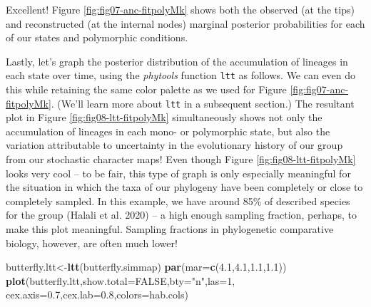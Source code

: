 \documentclass[fleqn,10pt,lineno]{wlpeerj} %
\newenvironment{Shaded}{\begin{snugshade}}{\end{snugshade}}
\newcommand{\AttributeTok}[1]{\textcolor[rgb]{0.13,0.29,0.53}{#1}}
\newcommand{\ConstantTok}[1]{\textcolor[rgb]{0.56,0.35,0.01}{#1}}
\newcommand{\DecValTok}[1]{\textcolor[rgb]{0.00,0.00,0.81}{#1}}
\newcommand{\FloatTok}[1]{\textcolor[rgb]{0.00,0.00,0.81}{#1}}
\newcommand{\FunctionTok}[1]{\textcolor[rgb]{0.13,0.29,0.53}{\textbf{#1}}}
\newcommand{\NormalTok}[1]{#1}
\newcommand{\OtherTok}[1]{\textcolor[rgb]{0.56,0.35,0.01}{#1}}
\newcommand{\StringTok}[1]{\textcolor[rgb]{0.31,0.60,0.02}{#1}}
\begin{document}
Excellent! Figure \ref{fig:fig07-anc-fitpolyMk} shows both the observed (at the tips) and reconstructed (at the internal nodes) marginal posterior probabilities for each of our states and polymorphic conditions.

Lastly, let's graph the posterior distribution of the accumulation of lineages in each state over time, using the \emph{phytools} function \texttt{ltt} as follows. We can even do this while retaining the same color palette as we used for Figure \ref{fig:fig07-anc-fitpolyMk}. (We'll learn more about \texttt{ltt} in a subsequent section.) The resultant plot in Figure \ref{fig:fig08-ltt-fitpolyMk} simultaneously shows not only the accumulation of lineages in each mono- or polymorphic state, but also the variation attributable to uncertainty in the evolutionary history of our group from our stochastic character maps! Even though Figure \ref{fig:fig08-ltt-fitpolyMk} looks very cool -- to be fair, this type of graph is only especially meaningful for the situation in which the taxa of our phylogeny have been completely or close to completely sampled. In this example, we have around 85\% of described species for the group (Halali et al. 2020) -- a high enough sampling fraction, perhaps, to make this plot meaningful. Sampling fractions in phylogenetic comparative biology, however, are often much lower!

\begin{Shaded}
\begin{Highlighting}[]
\NormalTok{butterfly.ltt}\OtherTok{\textless{}{-}}\FunctionTok{ltt}\NormalTok{(butterfly.simmap)}
\FunctionTok{par}\NormalTok{(}\AttributeTok{mar=}\FunctionTok{c}\NormalTok{(}\FloatTok{4.1}\NormalTok{,}\FloatTok{4.1}\NormalTok{,}\FloatTok{1.1}\NormalTok{,}\FloatTok{1.1}\NormalTok{))}
\FunctionTok{plot}\NormalTok{(butterfly.ltt,}\AttributeTok{show.total=}\ConstantTok{FALSE}\NormalTok{,}\AttributeTok{bty=}\StringTok{"n"}\NormalTok{,}\AttributeTok{las=}\DecValTok{1}\NormalTok{,}
  \AttributeTok{cex.axis=}\FloatTok{0.7}\NormalTok{,}\AttributeTok{cex.lab=}\FloatTok{0.8}\NormalTok{,}\AttributeTok{colors=}\NormalTok{hab.cols)}
\end{Highlighting}
\end{Shaded}
\end{document}
